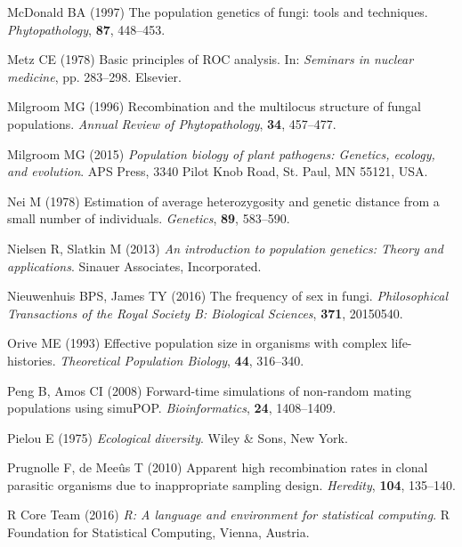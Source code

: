 \documentclass[]{article}
\theoremstyle{definition}
\theoremstyle{definition}
\theoremstyle{remark}
\begin{document}
\hypertarget{ref-mcdonald1997population}{}
McDonald BA (1997) The population genetics of fungi: tools and
techniques. \emph{Phytopathology}, \textbf{87}, 448--453.

\hypertarget{ref-metz1978basic}{}
Metz CE (1978) Basic principles of ROC analysis. In: \emph{Seminars in
nuclear medicine}, pp. 283--298. Elsevier.

\hypertarget{ref-milgroom1996recombination}{}
Milgroom MG (1996) Recombination and the multilocus structure of fungal
populations. \emph{Annual Review of Phytopathology}, \textbf{34},
457--477.

\hypertarget{ref-milgroom2015population}{}
Milgroom MG (2015) \emph{Population biology of plant pathogens:
Genetics, ecology, and evolution}. APS Press, 3340 Pilot Knob Road, St.
Paul, MN 55121, USA.

\hypertarget{ref-Nei:1978}{}
Nei M (1978) Estimation of average heterozygosity and genetic distance
from a small number of individuals. \emph{Genetics}, \textbf{89},
583--590.

\hypertarget{ref-nielsen2013introduction}{}
Nielsen R, Slatkin M (2013) \emph{An introduction to population
genetics: Theory and applications}. Sinauer Associates, Incorporated.

\hypertarget{ref-nieuwenhuis2016frequency}{}
Nieuwenhuis BPS, James TY (2016) The frequency of sex in fungi.
\emph{Philosophical Transactions of the Royal Society B: Biological
Sciences}, \textbf{371}, 20150540.

\hypertarget{ref-orive1993effective}{}
Orive ME (1993) Effective population size in organisms with complex
life-histories. \emph{Theoretical Population Biology}, \textbf{44},
316--340.

\hypertarget{ref-peng2008forward}{}
Peng B, Amos CI (2008) Forward-time simulations of non-random mating
populations using simuPOP. \emph{Bioinformatics}, \textbf{24},
1408--1409.

\hypertarget{ref-pielou1975ecological}{}
Pielou E (1975) \emph{Ecological diversity}. Wiley \& Sons, New York.

\hypertarget{ref-prugnolle2010apparent}{}
Prugnolle F, de Meeûs T (2010) Apparent high recombination rates in
clonal parasitic organisms due to inappropriate sampling design.
\emph{Heredity}, \textbf{104}, 135--140.

\hypertarget{ref-R2016}{}
R Core Team (2016) \emph{R: A language and environment for statistical
computing}. R Foundation for Statistical Computing, Vienna, Austria.
\end{document}
